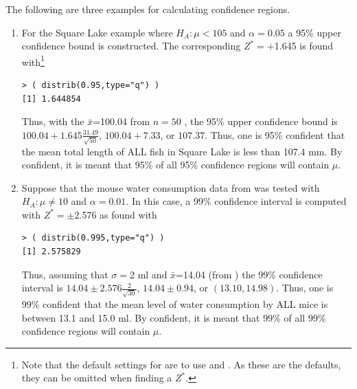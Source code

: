 \documentclass[10pt,openany]{book}\usepackage[]{graphicx}\usepackage[]{color}
\makeatletter
\newenvironment{kframe}{%
 \def\at@end@of@kframe{}%
 \ifinner\ifhmode%
  \def\at@end@of@kframe{\end{minipage}}%
  \begin{minipage}{\columnwidth}%
 \fi\fi%
 \def\FrameCommand##1{\hskip\@totalleftmargin \hskip-\fboxsep
 \colorbox{shadecolor}{##1}\hskip-\fboxsep
     \hskip-\linewidth \hskip-\@totalleftmargin \hskip\columnwidth}%
 \MakeFramed {\advance\hsize-\width
   \@totalleftmargin\z@ \linewidth\hsize
   \@setminipage}}%
 {\par\unskip\endMakeFramed%
 \at@end@of@kframe}
\newenvironment{knitrout}{}{} %
\makeatother
\begin{document}
The following are three examples for calculating confidence regions.
\begin{enumerate}
  \item For the Square Lake example where $H_{A}:\mu < 105$ and $\alpha=0.05$ a 95\% upper confidence bound is constructed.  The corresponding $Z^{*}=+$1.645 is found with\footnote{Note that the default settings for  are to use  and . As these are the defaults, they can be omitted when finding a $Z^{*}$.}
\begin{knitrout}
\color{fgcolor}\begin{kframe}
\begin{verbatim}
> ( distrib(0.95,type="q") )
[1] 1.644854
\end{verbatim}
\end{kframe}
\end{knitrout}
Thus, with the $\bar{x}$=100.04 from $n=50$ , the 95\% upper confidence bound is $100.04+1.645\frac{31.49}{\sqrt{50}}$, $100.04+7.33$, or $107.37$.  Thus, one is 95\% confident that the mean total length of ALL fish in Square Lake is less than 107.4 mm.  By confident, it is meant that 95\% of all 95\% confidence regions will contain $\mu$.

  \item Suppose that the mouse water consumption data from  was tested with $H_{A}:\mu \neq 10$ and $\alpha=0.01$.  In this case, a 99\% confidence interval is computed with $Z^{*}=\pm$2.576 as found with
\begin{knitrout}
\color{fgcolor}\begin{kframe}
\begin{verbatim}
> ( distrib(0.995,type="q") )
[1] 2.575829
\end{verbatim}
\end{kframe}
\end{knitrout}
Thus, assuming that $\sigma=$2 ml and $\bar{x}$=14.04 (from ) the 99\% confidence interval is $14.04\pm2.576\frac{2}{\sqrt{30}}$, $14.04\pm0.94$, or $(13.10,14.98)$.  Thus, one is 99\% confident that the mean level of water consumption by ALL mice is between 13.1 and 15.0 ml.  By confident, it is meant that 99\% of all 99\% confidence regions will contain $\mu$.


\end{enumerate}
\end{document}
